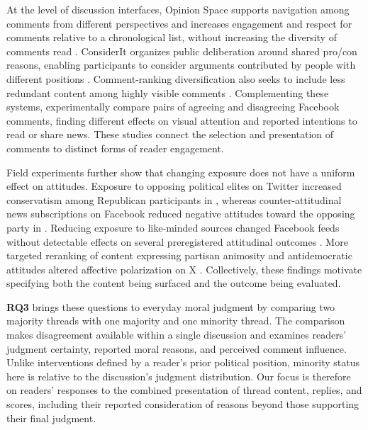 At the level of discussion interfaces, Opinion Space supports navigation
among comments from different perspectives and increases engagement and
respect for comments relative to a chronological list, without increasing
the diversity of comments read \cite{faridani2010opinion}. ConsiderIt
organizes public deliberation around shared pro/con reasons, enabling
participants to consider arguments contributed by people with different
positions \cite{kriplean2012considerit}. Comment-ranking diversification
also seeks to include less redundant content among highly visible
comments \cite{northcutt2017diversification}. Complementing these systems,
\citet{dutceac2022cueing} experimentally compare pairs of agreeing and
disagreeing Facebook comments, finding different effects on visual
attention and reported intentions to read or share news. These studies
connect the selection and presentation of comments to distinct forms of
reader engagement.

Field experiments further show that changing exposure does not have a
uniform effect on attitudes. Exposure to opposing political elites on
Twitter increased conservatism among Republican participants in
\citet{bail2018exposure}, whereas counter-attitudinal news subscriptions
on Facebook reduced negative attitudes toward the opposing party in
\citet{levy2021social}. Reducing exposure to like-minded sources changed
Facebook feeds without detectable effects on several preregistered
attitudinal outcomes \cite{nyhan2023likeminded}. More targeted reranking
of content expressing partisan animosity and antidemocratic attitudes
altered affective polarization on X \cite{piccardi2025reranking}.
Collectively, these findings motivate specifying both the content being
surfaced and the outcome being evaluated.

\textbf{RQ3} brings these questions to everyday moral judgment by comparing
two majority threads with one majority and one minority thread. The
comparison makes disagreement available within a single discussion and
examines readers' judgment certainty, reported moral reasons, and
perceived comment influence. Unlike interventions defined by a reader's
prior political position, minority status here is relative to the
discussion's judgment distribution. Our focus is therefore on readers'
responses to the combined presentation of thread content, replies, and
scores, including their reported consideration of reasons beyond those
supporting their final judgment.
